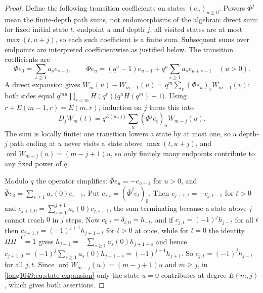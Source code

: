 \begin{proof}
Define the following transition coefficients on states $(e_u)_{u\ge0}$.
Powers $\Phi^j$ mean the finite-depth path sums, not endomorphisms of the
algebraic direct sum: for fixed initial state $t$, endpoint $u$ and depth $j$,
all visited states are at most $\max(t,u+j)$, so each such coefficient is a
finite sum.  Subsequent sums over endpoints are interpreted coefficientwise
as justified below.  The transition coefficients are
\[
 \Phi e_0=\sum_{s\ge1}a_se_{s-1},
 \qquad
 \Phi e_u=(q^{u}-1)e_{u-1}+q^{u}\sum_{s\ge1}a_se_{u+s-1}\quad(u>0).
\]
A direct expansion gives
$W_m(u)-W_{m-1}(u)=q^{m}\sum_v(\Phi e_u)_vW_{m-1}(v)$: both sides equal
$q^{mu}\prod_{r<m}H(q^{r})\bigl(q^{u}H(q^{m})-1\bigr)$.  Using
$r+E(m-1,r)=E(m,r)$, induction on $j$ turns this into
\begin{equation}\label{long1049:eq:state-expansion}
 D_jW_m(t)=q^{E(m,j)}\sum_u(\Phi^{j}e_t)_uW_{m-j}(u).
\end{equation}
The sum is locally finite: one transition lowers a state by at most one, so a
depth-$j$ path ending at $u$ never visits a state above $\max(t,u+j)$, and
$\operatorname{ord}W_{m-j}(u)=(m-j+1)u$, so only finitely many endpoints
contribute to any fixed power of $q$.

Modulo $q$ the operator simplifies: $\bar\Phi e_u=-e_{u-1}$ for $u>0$, and
$\bar\Phi e_0=\sum_{s\ge1}a_s(0)e_{s-1}$.  Put $c_{j,t}=(\bar\Phi^{j}e_t)_0$.
Then $c_{j+1,t}=-c_{j,t-1}$ for $t>0$ and
$c_{j+1,0}=\sum_{s=1}^{j+1}a_s(0)c_{j,s-1}$, the sum terminating because a state
above $j$ cannot reach $0$ in $j$ steps.  Now $c_{0,t}=\delta_{t,0}=h_{-t}$, and
if $c_{j,t}=(-1)^{j}h_{j-t}$ for all $t$ then $c_{j+1,t}=(-1)^{j+1}h_{j+1-t}$ for
$t>0$ at once, while for $t=0$ the identity $\bar H\bar H^{-1}=1$ gives
$h_{j+1}=-\sum_{s\ge1}a_s(0)h_{j+1-s}$ and hence
$c_{j+1,0}=(-1)^{j}\sum_{s\ge1}a_s(0)h_{j+1-s}=(-1)^{j+1}h_{j+1}$.  So
$c_{j,t}=(-1)^{j}h_{j-t}$ for all $j,t$.  Since
$\operatorname{ord}W_{m-j}(u)=(m-j+1)u$ and $m\ge j$, in
\eqref{long1049:eq:state-expansion} only the state $u=0$ contributes at degree $E(m,j)$,
which gives both assertions.
\end{proof}


